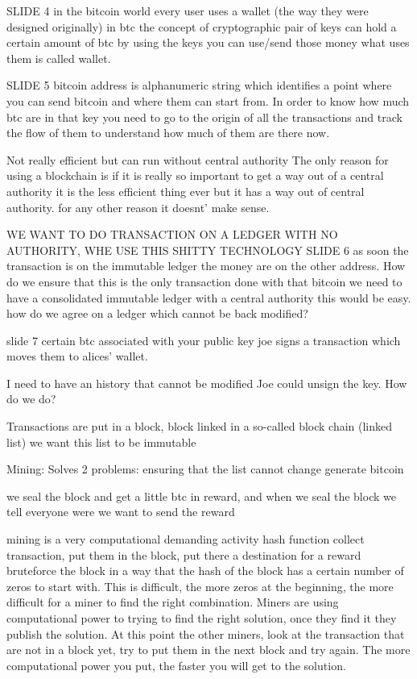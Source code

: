 SLIDE 4
    in the bitcoin world every user uses a wallet (the way they were designed originally)
    in btc the concept of cryptographic pair of keys can hold a certain amount of btc
    by using the keys you can use/send those money
    what uses them is called wallet.

SLIDE 5
    bitcoin address is alphanumeric string which identifies a point where you can send bitcoin
    and where them can start from.
    In order to know how much btc are in that key you need to go to the origin of all the transactions and track the flow of them to understand how much of them are there now.

    Not really efficient but can run without central authority 
    The only reason for using a blockchain is if it is really so important to get a way out of a central authority
    it is the less efficient thing ever but it has a way out of central authority.
    for any other reason it doesnt' make sense.

    WE WANT TO DO TRANSACTION ON A LEDGER WITH NO AUTHORITY, WHE USE THIS SHITTY TECHNOLOGY
SLIDE 6
    as soon the transaction is on the immutable ledger the money are on the other address.
    How do we ensure that this is the only transaction done with that bitcoin 
    we need to have a consolidated immutable ledger
    with a central authority this would be easy.
    how do we agree on a ledger which cannot be back modified?

    slide 7
        certain btc associated with your public key
        joe signs a transaction which moves them to alices' wallet.

        I need to have an history that cannot be modified
            Joe could unsign the key. How do we do?

        Transactions are put in a block, block linked in a so-called block chain (linked list)
        we want this list to be immutable

        Mining:
            Solves 2 problems:
                ensuring that the list cannot change 
                generate bitcoin

                we seal the block and get a little btc in reward, and when we seal the block we tell everyone were we want to send the reward

                mining is a very computational demanding activity
                    hash function 
                    collect transaction, put them in the block, put there a destination for a reward
                    bruteforce the block in a way that the hash of the block has a certain number of zeros to start with.
                    This is difficult, the more zeros at the beginning, the more difficult for a miner to find the right combination.
                    Miners are using computational power to trying to find the right solution, once they find it they publish the solution.
                    At this point the other miners, look at the transaction that are not in a block yet, try to put them in the next block and try again.
                    The more computational power you put, the faster you will get to the solution.

